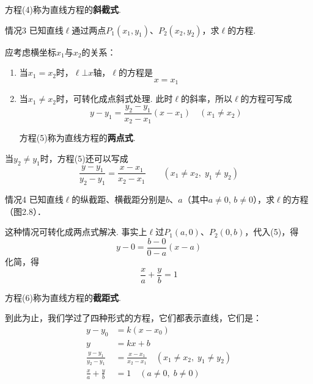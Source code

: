 方程(4)称为直线方程的\textbf{斜截式}.

\begin{thm}
  {情况3} 已知直线$\ell$通过两点$P_1(x_1,y_1)$、$P_2(x_2,y_2)$，求$\ell$的方程.  
\end{thm}

应考虑横坐标$x_1$与$x_2$的关系：
\begin{enumerate}[(1)]
\item 当$x_1=x_2$时，$\ell\bot x$轴，$\ell$的方程是
\[x=x_1\]
\item 当$x_1\ne x_2$时，可转化成点斜式处理. 此时$\ell$的斜率，所以$\ell$的方程可写成
\begin{equation}
y-y_1=\frac{y_2-y_1}{x_2-x_1}(x-x_1)\quad (x_1\ne x_2) \tag{5}    
\end{equation}

方程(5)称为直线方程的\textbf{两点式}.
\end{enumerate}

当$y_2\ne y_1$时，方程(5)还可以写成
\begin{equation}
    \frac{y-y_1}{y_2-y_1}=\frac{x-x_1}{x_2-x_1}\qquad (x_1\ne x_2,\; y_1\ne y_2) \tag{5}
\end{equation}

\begin{thm}
    {情况4} 已知直线$\ell$的纵截距、横截距分别是$b$、$a$（其中$a\ne 0$, $b\ne 0$），求$\ell$的方程（图2.8）．
\end{thm}

\noindent
\begin{minipage}{.55\textwidth}
    \CTEXindent
这种情况可转化成两点式解决. 事实上$\ell$过$P_1(a,0)$、$P_2(0,b)$，代入(5)，得
\[y-0=\frac{b-0}{0-a}(x-a)\]
化简，得
\begin{equation}
    \frac{x}{a}+\frac{y}{b}=1  \tag{6}
\end{equation}    
\end{minipage}
\hfill
\begin{minipage}{.4\textwidth}
\centering
{}
\end{minipage}


方程(6)称为直线方程的\textbf{截距式}.

到此为止，我们学过了四种形式的方程，它们都表示直线，它们是：
\begin{align}
y-y_0&=k(x-x_0)  \tag{1}\\
y&=kx+b \tag{2}\\
\frac{y-y_1}{y_2-y_1}&=\frac{x-x_1}{x_2-x_1}\quad (x_1\ne x_2,\; y_1\ne y_2)\tag{3}\\
\frac{x}{a}+\frac{y}{b}&=1\quad (a\ne0,\; b\ne 0)\tag{4}
\end{align}

